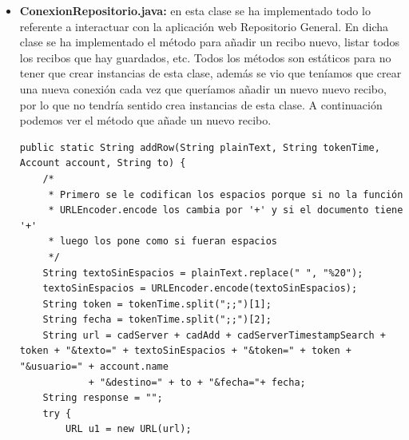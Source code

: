 \begin{itemize}
\begin{lstlisting}[style=Java]
// Para que cuando cambie el texto lo cambie también en el título...
textPath.setOnPreferenceChangeListener(new OnPreferenceChangeListener() {
	public boolean onPreferenceChange(Preference preference, Object newValue) {
		EditTextPreference textPath = (EditTextPreference) preference;
		String s = (String) newValue;

		String pass = settings.getString("certificate_password", "NotValue");
		if (!pass.equals("NotValue")) {
			boolean check = AuxiliaryFunction.checkCert(s, pass);

			if (check) {
				textPath.setSummary(s);
				textPath.setText(s);
				Editor editor = settings.edit();
				editor.putString("path_certificate", s);
				editor.commit();
				return true;
			} else {
				textPath.setSummary("No se ha podido cargar el certificado,\nla ruta no es correcta");
				return true;
			}
		} else {
			textPath.setSummary("Password no guardado");
			return true;
		}

	}

});
\end{lstlisting}

Creamos la variable EditTextPreference donde mostraremos el password del certificado que estamos usando para firmar el texto. A continuación implementamos el listener \lstinline{OnPreferenceChangeListener}, el cual se activará cuando cambiemos el password del certificado. Podemos observar que cuando introducimos un nuevo password hacemos una comprobación para ver si después del cambio podemos seguir usando dicho certificado, si no es posible informamos al usuario mostrando un mensaje en el que se le indicará que no se ha guardado el password.

\item \textbf{ConexionRepositorio.java:} en esta clase se ha implementado todo lo referente a interactuar con la aplicación web Repositorio General. En dicha clase se ha implementado el método para añadir un recibo nuevo, listar todos los recibos que hay guardados, etc. Todos los métodos son estáticos para no tener que crear instancias de esta clase, además se vio que teníamos que crear una nueva conexión cada vez que queríamos añadir un nuevo nuevo recibo, por lo que no tendría sentido crea instancias de esta clase. A continuación podemos ver el método que añade un nuevo recibo.

\begin{lstlisting}[style=Java]
public static String addRow(String plainText, String tokenTime, Account account, String to) {
	/*
	 * Primero se le codifican los espacios porque si no la función
	 * URLEncoder.encode los cambia por '+' y si el documento tiene '+'
	 * luego los pone como si fueran espacios
	 */
	String textoSinEspacios = plainText.replace(" ", "%20");
	textoSinEspacios = URLEncoder.encode(textoSinEspacios);
	String token = tokenTime.split(";;")[1];
	String fecha = tokenTime.split(";;")[2];
	String url = cadServer + cadAdd + cadServerTimestampSearch + token + "&texto=" + textoSinEspacios + "&token=" + token + "&usuario=" + account.name
			+ "&destino=" + to + "&fecha="+ fecha;
	String response = "";
	try {
		URL u1 = new URL(url);


\end{lstlisting}
\end{itemize}
